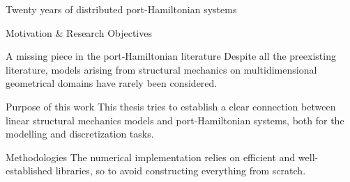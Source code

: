 \documentclass[aspectratio=169]{ISAE-Beamer}
\begin{document}
\begin{frame}{Twenty years of distributed port-Hamiltonian systems}
\begin{overlayarea}{\textwidth}{\textheight}
\end{overlayarea}
\end{frame}

\begin{frame}{Motivation \& Research Objectives}

\begin{alertblock}{A missing piece in the port-Hamiltonian literature}
Despite all the preexisting literature, models arising from structural mechanics on multidimensional geometrical domains have rarely been considered. 
\end{alertblock}

\begin{block}{Purpose of this work}
This thesis tries to establish a clear connection between linear structural mechanics models
and port-Hamiltonian systems, both for the modelling and discretization tasks.
\end{block}

\begin{exampleblock}{Methodologies}
The numerical implementation relies on efficient and well-established libraries, so to avoid constructing everything from scratch.
\end{exampleblock}

\end{frame}
\end{document}
